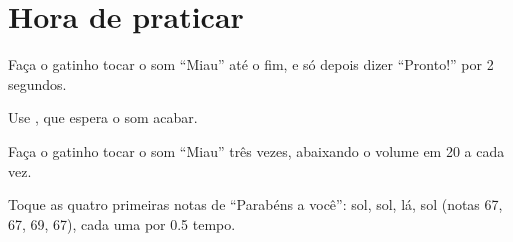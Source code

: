 \section{Hora de praticar}

\begin{exercicio}
Faça o gatinho tocar o som ``Miau'' até o fim, e só depois dizer ``Pronto!'' por 2 segundos.
\end{exercicio}

\begin{solucao}
Use , que espera o som acabar.
\begin{pilha}
\end{pilha}
\end{solucao}

\begin{exercicio}
Faça o gatinho tocar o som ``Miau'' três vezes, abaixando o volume em 20 a cada vez.
\end{exercicio}

\begin{solucao}
\begin{pilha}
\sbcend
\end{pilha}
\end{solucao}

\begin{exercicio}
Toque as quatro primeiras notas de ``Parabéns a você'': sol, sol, lá, sol (notas 67, 67, 69, 67), cada uma por 0.5 tempo.
\end{exercicio}

\begin{solucao}
\begin{pilha}
\end{pilha}
\end{solucao}

